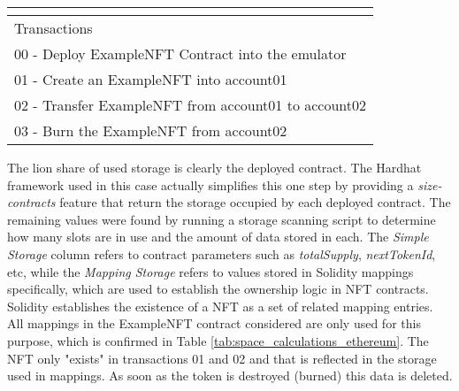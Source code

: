 \documentclass[../NFTComp_IEEE.tex]{subfiles}
\begin{document}
\begin{table}[ht]
{\begin{tabular}{ccccc}
            \multicolumn{1}{l}{}                               & \multicolumn{1}{l}{}                                                           & \multicolumn{1}{l}{}                         & \multicolumn{1}{l}{}                          & \multicolumn{1}{l}{}                \\ \hline
            \multicolumn{5}{|l|}{Transactions}                                                                                                                                                                                                                                       \\ \hline
            \multicolumn{5}{|l|}{00 - Deploy ExampleNFT Contract into the emulator}                                                                                                                                                                                                  \\ \hline
            \multicolumn{5}{|l|}{01 - Create an ExampleNFT into account01}                                                                                                                                                                                                           \\ \hline
            \multicolumn{5}{|l|}{02 - Transfer ExampleNFT from account01 to account02}                                                                                                                                                                                               \\ \hline
            \multicolumn{5}{|l|}{03 - Burn the ExampleNFT from account02}                                                                                                                                                                                                            \\ \hline
        \end{tabular}%
    }
\end{table}

The lion share of used storage is clearly the deployed contract. The Hardhat framework used in this case actually simplifies this one step by providing a \textit{size-contracts} feature that return the storage occupied by each deployed contract. The remaining values were found by running a storage scanning script to determine how many slots are in use and the amount of data stored in each. The \textit{Simple Storage} column refers to contract parameters such as \textit{totalSupply}, \textit{nextTokenId}, etc, while the \textit{Mapping Storage} refers to values stored in Solidity mappings specifically, which are used to establish the ownership logic in NFT contracts. Solidity establishes the existence of a NFT as a set of related mapping entries. All mappings in the ExampleNFT contract considered are only used for this purpose, which is confirmed in Table \ref{tab:space_calculations_ethereum}. The NFT only "exists" in transactions 01 and 02 and that is reflected in the storage used in mappings. As soon as the token is destroyed (burned) this data is deleted.
\end{document}
